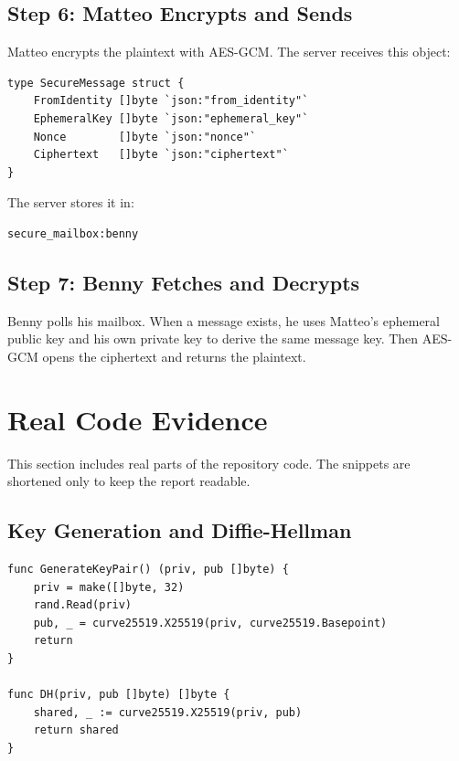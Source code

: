 \documentclass[12pt,a4paper]{article}
\begin{document}
\subsection{Step 6: Matteo Encrypts and Sends}

Matteo encrypts the plaintext with AES-GCM. The server receives this object:

\begin{lstlisting}[style=code, caption={Secure message format from server/main.go}]
type SecureMessage struct {
    FromIdentity []byte `json:"from_identity"`
    EphemeralKey []byte `json:"ephemeral_key"`
    Nonce        []byte `json:"nonce"`
    Ciphertext   []byte `json:"ciphertext"`
}
\end{lstlisting}

The server stores it in:

\begin{lstlisting}[style=output]
secure_mailbox:benny
\end{lstlisting}

\subsection{Step 7: Benny Fetches and Decrypts}

Benny polls his mailbox. When a message exists, he uses Matteo's ephemeral public key and his own private key to derive the same message key. Then AES-GCM opens the ciphertext and returns the plaintext.

\section{Real Code Evidence}

This section includes real parts of the repository code. The snippets are shortened only to keep the report readable.

\subsection{Key Generation and Diffie-Hellman}

\begin{lstlisting}[style=code, caption={X25519 key generation and shared secret in internal/crypto/crypto.go}]
func GenerateKeyPair() (priv, pub []byte) {
    priv = make([]byte, 32)
    rand.Read(priv)
    pub, _ = curve25519.X25519(priv, curve25519.Basepoint)
    return
}

func DH(priv, pub []byte) []byte {
    shared, _ := curve25519.X25519(priv, pub)
    return shared
}
\end{lstlisting}
\end{document}
